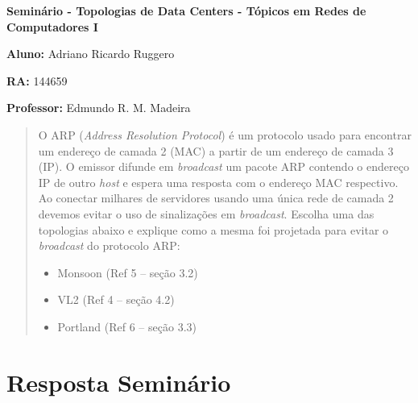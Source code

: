 \documentclass[12pt,twoside,a4paper]{article}
\begin{document}
\vskip 15mm

\begin{center} 
\textbf{Seminário  - Topologias de Data Centers - Tópicos em Redes de Computadores I}

\end{center}

\vskip 5mm

\textbf{Aluno:} Adriano Ricardo Ruggero

\textbf{RA:} 144659

\textbf{Professor:} Edmundo R. M. Madeira

\vskip 20mm

\begin{abstract}

O ARP (\textit{Address Resolution Protocol}) é um protocolo usado
para encontrar um endereço de camada 2 (MAC) a partir de
um endereço de camada 3 (IP). O emissor difunde em
\textit{broadcast} um pacote ARP contendo o endereço IP de outro
\textit{host} e espera uma resposta com o endereço MAC respectivo.
Ao conectar milhares de servidores usando uma única rede
de camada 2 devemos evitar o uso de sinalizações em
\textit{broadcast}. Escolha uma das topologias abaixo e explique
como a mesma foi projetada para evitar o \textit{broadcast} do
protocolo ARP:
\begin{itemize}

\item Monsoon (Ref 5 – seção 3.2)

\item VL2 (Ref 4 – seção 4.2)

\item Portland (Ref 6 – seção 3.3)

\end{itemize}

\end{abstract}

\newpage
\pagestyle{plain}
\headheight 0.0cm
\headsep 0.0cm
\footskip 2.2cm

\section{Resposta Seminário}
\label{sec:01}





\end{document}
